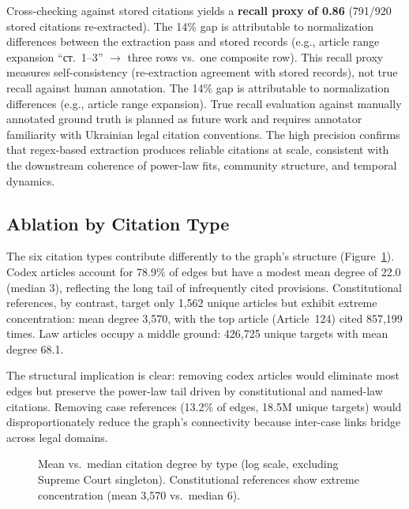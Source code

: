 \documentclass[11pt]{article}
\begin{document}
Cross-checking against stored citations yields a \textbf{recall proxy of 0.86} (791/920 stored citations re-extracted).
The 14\% gap is attributable to normalization differences between the extraction pass and stored records (e.g., article range expansion ``\foreignlanguage{ukrainian}{ст.~1--3}'' $\to$ three rows vs.\ one composite row).
This recall proxy measures self-consistency (re-extraction agreement with stored records), not true recall against human annotation. The 14\% gap is attributable to normalization differences (e.g., article range expansion). True recall evaluation against manually annotated ground truth is planned as future work and requires annotator familiarity with Ukrainian legal citation conventions.
The high precision confirms that regex-based extraction produces reliable citations at scale, consistent with the downstream coherence of power-law fits, community structure, and temporal dynamics.


\subsection{Ablation by Citation Type}
\label{sec:ablation}

The six citation types contribute differently to the graph's structure (Figure~\ref{fig:ablation-types}).
Codex articles account for 78.9\% of edges but have a modest mean degree of 22.0 (median 3), reflecting the long tail of infrequently cited provisions.
Constitutional references, by contrast, target only 1{,}562 unique articles but exhibit extreme concentration: mean degree 3{,}570, with the top article (Article~124) cited 857{,}199 times.
Law articles occupy a middle ground: 426{,}725 unique targets with mean degree 68.1.

The structural implication is clear: removing codex articles would eliminate most edges but preserve the power-law tail driven by constitutional and named-law citations.
Removing case references (13.2\% of edges, 18.5M unique targets) would disproportionately reduce the graph's connectivity because inter-case links bridge across legal domains.

\begin{figure}[t]
\centering

\caption{Mean vs.\ median citation degree by type (log scale, excluding Supreme Court singleton). Constitutional references show extreme concentration (mean 3{,}570 vs.\ median 6).}
\label{fig:ablation-types}
\end{figure}
\end{document}
